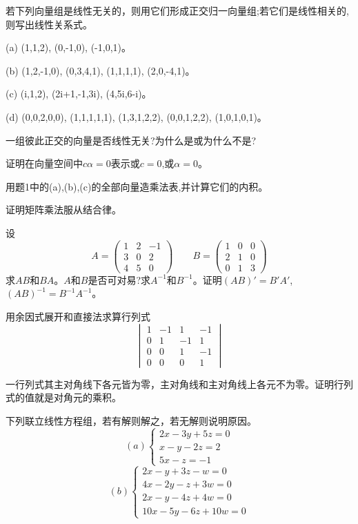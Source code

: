 \begin{problemset}
\item 若下列向量组是线性无关的，则用它们形成正交归一向量组;若它们是线性相关的,则写出线性关系式。

(a) (1,1,2), (0,-1,0), (-1,0,1)。

(b) (1,2,-1,0), (0,3,4,1), (1,1,1,1), (2,0,-4,1)。

(c) (i,1,2), (2i+1,-1,3i), (4,5i,6-i)。

(d) (0,0,2,0,0), (1,1,1,1,1), (1,3,1,2,2), (0,0,1,2,2), (1,0,1,0,1)。
\item 一组彼此正交的向量是否线性无关?为什么是或为什么不是?
\item 证明在向量空间中$c\alpha=0$表示或$c=0$,或$\alpha=0$。
\item 用题1中的(a),(b),(c)的全部向量造乘法表,并计算它们的内积。
\item 证明矩阵乘法服从结合律。
\item 设
\[
A=
\begin{pmatrix}
    1 & 2 & -1 \\
    3 & 0 & 2 \\
    4 & 5 & 0
\end{pmatrix}
\qquad
B=
\begin{pmatrix}
    1 & 0 & 0 \\
    2 & 1 & 0 \\
    0 & 1 & 3
\end{pmatrix}
\]
求$AB$和$BA$。$A$和$B$是否可对易?求$A^{-1}$和$B^{-1}$。证明$(AB)'=B'A'$, $(AB)^{-1}=B^{-1}A^{-1}$。
\item 用余因式展开和直接法求算行列式
\[
\begin{vmatrix}
    1 & -1 & 1 & -1 \\
    0 & 1 & -1 & 1 \\
    0 & 0 & 1 & -1 \\
    0 & 0 & 0 & 1
\end{vmatrix}    
\]
\item 一行列式其主对角线下各元皆为零，主对角线和主对角线上各元不为零。证明行列式的值就是对角元的乘积。
\item 下列联立线性方程组，若有解则解之，若无解则说明原因。
\[
(a)
\left \{
\begin{array}{c}
    2x-3y+5z=0 \\ x-y-2z=2 \\ 5x-z=-1
\end{array}
\right .
\]
\[
(b)
\left \{
\begin{array}{c}
    2x-y+3z-w=0 \\ 4x-2y-z+3w=0 \\ 2x-y-4z+4w=0 \\ 10x-5y-6z+10w=0

\end{array}\]
\end{problemset}
